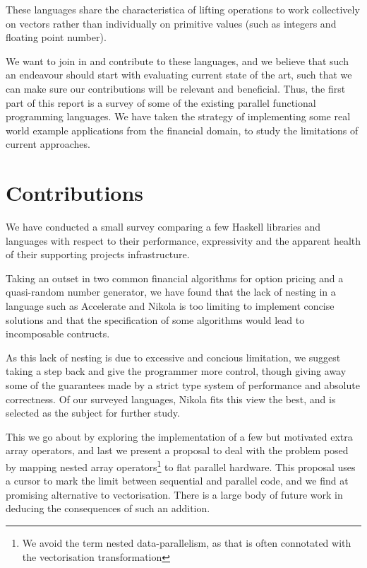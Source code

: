 These languages share the characteristica of lifting operations to
work collectively on vectors rather than individually on primitive
values (such as integers and floating point number).

We want to join in and contribute to these languages, and we believe
that such an endeavour should start with evaluating current state of
the art, such that we can make sure our contributions will be relevant
and beneficial. Thus, the first part of this report is a survey of
some of the existing parallel functional programming languages. We
have taken the strategy of implementing some real world example
applications from the financial domain, to study the limitations of
current approaches.


\section{Contributions}

We have conducted a small survey comparing a few Haskell libraries and
languages with respect to their performance, expressivity and the apparent
health of their supporting projects infrastructure.

Taking an outset in two common financial algorithms for option pricing
and a quasi-random number generator, we have found that the lack of
nesting in a language such as Accelerate and Nikola is too limiting to
implement concise solutions and that the specification of some
algorithms would lead to incomposable contructs.

As this lack of nesting is due to excessive and concious limitation,
we suggest taking a step back and give the programmer more control,
though giving away some of the guarantees made by a strict type system
of performance and absolute correctness. Of our surveyed languages,
Nikola fits this view the best, and is selected as the subject for
further study.

This we go about by exploring the implementation of a few but
motivated extra array operators, and last we present a proposal to
deal with the problem posed by mapping nested array
operators\footnote{We avoid the term nested data-parallelism, as that
  is often connotated with the vectorisation transformation} to flat
parallel hardware. This proposal uses a cursor to mark the limit
between sequential and parallel code, and we find at promising
alternative to vectorisation. There is a large body of future work in
deducing the consequences of such an addition.

